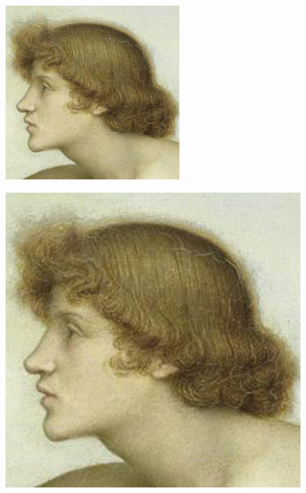 \documentclass{article}
\theoremstyle{definition}
\begin{document}
\begin{figure}[h]
\centering
\begin{minipage}{.5\textwidth}
  \centering
  \includegraphics[width=1\linewidth]{Imagenes/Phosphorus_and_Hesperus_original.png}
  \label{fig:test1}
\end{minipage}%
\begin{minipage}{.5\textwidth}
  \centering
  \includegraphics[width=1\linewidth]{Imagenes/Phosphorus_and_Hesperus_Paint_Shop_Pro.png}
  \label{fig:test2}
\end{minipage}
\end{figure}
\end{document}
